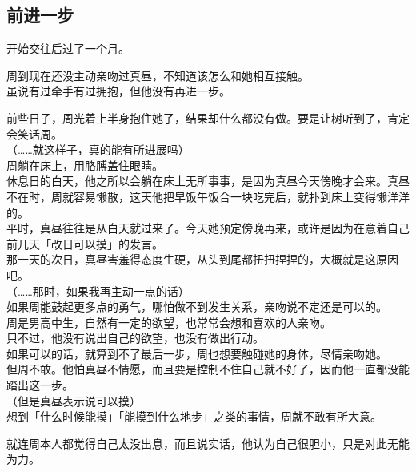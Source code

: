 \subsection{前进一步}

开始交往后过了一个月。

周到现在还没主动亲吻过真昼，不知道该怎么和她相互接触。\\

虽说有过牵手有过拥抱，但他没有再进一步。

前些日子，周光着上半身抱住她了，结果却什么都没有做。要是让树听到了，肯定会笑话周。\\

（……就这样子，真的能有所进展吗）\\

周躺在床上，用胳膊盖住眼睛。\\

休息日的白天，他之所以会躺在床上无所事事，是因为真昼今天傍晚才会来。真昼不在时，周就容易懒散，这天他把早饭午饭合一块吃完后，就扑到床上变得懒洋洋的。\\

平时，真昼往往是从白天就过来了。今天她预定傍晚再来，或许是因为在意着自己前几天「改日可以摸」的发言。\\

那一天的次日，真昼害羞得态度生硬，从头到尾都扭扭捏捏的，大概就是这原因吧。\\

（……那时，如果我再主动一点的话）\\

如果周能鼓起更多点的勇气，哪怕做不到发生关系，亲吻说不定还是可以的。\\

周是男高中生，自然有一定的欲望，也常常会想和喜欢的人亲吻。\\

只不过，他没有说出自己的欲望，也没有做出行动。\\

如果可以的话，就算到不了最后一步，周也想要触碰她的身体，尽情亲吻她。\\

但周不敢。他怕真昼不情愿，而且要是控制不住自己就不好了，因而他一直都没能踏出这一步。\\

（但是真昼表示说可以摸）\\

想到「什么时候能摸」「能摸到什么地步」之类的事情，周就不敢有所大意。

就连周本人都觉得自己太没出息，而且说实话，他认为自己很胆小，只是对此无能为力。\\


